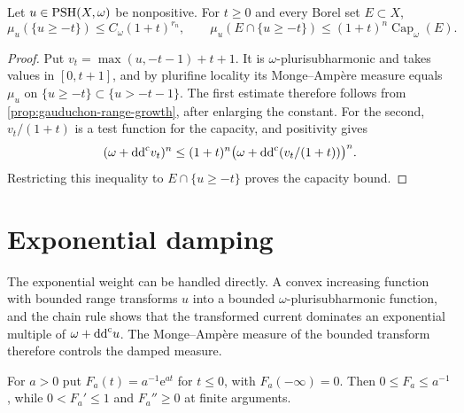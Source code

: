 \begin{lemma}\label{lem:sublevel-mass-growth}
Let $u\in\mathrm{PSH}(X,\omega)$ be nonpositive. For $t\geq0$ and every Borel set $E\subset X$,
\begin{equation}\label{eq:restricted-mass-growth}
 \mu_u(\{u\geq-t\})\leq C_\omega(1+t)^{r_n},
 \qquad
 \mu_u(E\cap\{u\geq-t\})\leq(1+t)^n\operatorname{Cap}_\omega(E).
\end{equation}
\end{lemma}
\begin{proof}
Put $v_t=\max(u,-t-1)+t+1$. It is $\omega$-plurisubharmonic and takes values in $[0,t+1]$, and by plurifine locality its Monge--Amp\`ere measure equals $\mu_u$ on $\{u\geq-t\}\subset\{u>-t-1\}$. The first estimate therefore follows from \cref{prop:gauduchon-range-growth}, after enlarging the constant. For the second, $v_t/(1+t)$ is a test function for the capacity, and positivity gives
\[
 (\omega+\mathrm{dd}^{\mathrm{c}} v_t)^n
 \leq(1+t)^n\bigl(\omega+\mathrm{dd}^{\mathrm{c}}(v_t/(1+t))\bigr)^n.
\]
Restricting this inequality to $E\cap\{u\geq-t\}$ proves the capacity bound.
\end{proof}

\section{Exponential damping}

The exponential weight can be handled directly. A convex increasing function with bounded range transforms $u$ into a bounded $\omega$-plurisubharmonic function, and the chain rule shows that the transformed current dominates an exponential multiple of $\omega+\mathrm{dd}^{\mathrm{c}} u$. The Monge--Amp\`ere measure of the bounded transform therefore controls the damped measure.

For $a>0$ put $F_a(t)=a^{-1}\mathrm{e}^{at}$ for $t\leq0$, with $F_a(-\infty)=0$. Then $0\leq F_a\leq a^{-1}$, while $0<F_a'\leq1$ and $F_a''\geq0$ at finite arguments.

